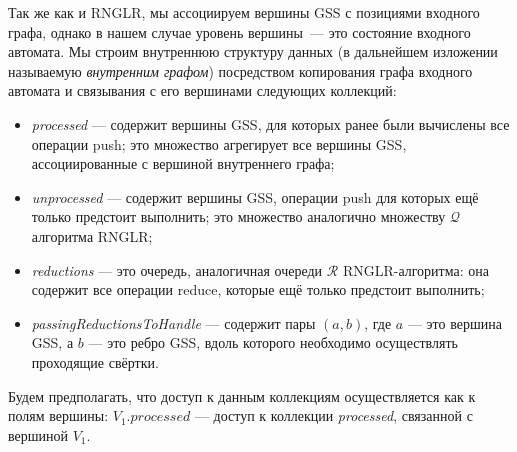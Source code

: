 Так же как и RNGLR, мы ассоциируем вершины GSS с позициями входного графа, однако в нашем случае уровень вершины~--- это состояние входного автомата. Мы строим внутреннюю структуру данных (в дальнейшем изложении называемую \emph{внутренним графом}) посредством копирования графа входного автомата и связывания с его вершинами следующих коллекций:
\begin{itemize}
  \item \emph{processed} --- содержит вершины GSS, для которых ранее были вычислены все операции push; это множество агрегирует все вершины GSS, ассоциированные с вершиной внутреннего графа;
  \item \emph{unprocessed} --- содержит вершины GSS, операции push для которых ещё только предстоит выполнить; это множество аналогично множеству $\mathcal{Q}$ алгоритма RNGLR;
  \item \emph{reductions} --- это очередь, аналогичная очереди $\mathcal{R}$ RNGLR-алгоритма: она содержит все операции reduce, которые ещё только предстоит выполнить;
  \item \emph{passingReductionsToHandle} --- содержит пары $(a,b)$, где $a$ --- это вершина GSS, а $b$ --- это ребро GSS, вдоль которого необходимо осуществлять проходящие свёртки.
\end{itemize}

Будем предполагать, что доступ к данным коллекциям осуществляется как к полям вершины: $V_1.processed$ --- доступ к коллекции \emph{processed}, связанной с вершиной $V_1$.

